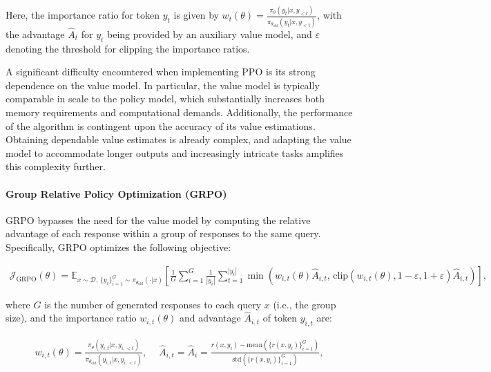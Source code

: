 Here, the importance ratio for token $y_t$ is given by $
w_{t}(\theta) = \frac{ \pi_{\theta} (y_{t} | x, y_{<t}) }{ \pi_{\theta_\text{old}} (y_{t} | x,y_{<t})} $, with the advantage $\widehat{A}_{t}$ for $y_t$ being provided by an auxiliary value model, and $\varepsilon$ denoting the threshold for clipping the importance ratios.

A significant difficulty encountered when implementing PPO is its strong dependence on the value model. In particular, the value model is typically comparable in scale to the policy model, which substantially increases both memory requirements and computational demands. Additionally, the performance of the algorithm is contingent upon the accuracy of its value estimations. Obtaining dependable value estimates is already complex, and adapting the value model to accommodate longer outputs and increasingly intricate tasks amplifies this complexity further.

\paragraph{Group Relative Policy Optimization (GRPO)} GRPO \citep{grpo} bypasses the need for the value model by computing the relative advantage of each response within a group of responses to the same query. Specifically, GRPO optimizes the following objective:

\begin{align}
\label{equ:grpo}
\mathcal{J}_\text{GRPO}(\theta) = \mathbb{E}_{ x \sim \mathcal{D},\, \{y_i\}_{i=1}^G \sim \pi_{\theta_\text{old}}( \cdot | x) }
\left[ \frac{1}{G} \sum_{i=1}^{G} \frac{1}{|y_i|} \sum_{t=1}^{|y_i|} 
\min \left( w_{i,t}(\theta) \widehat{A}_{i,t},  \, \mathrm{clip} \left( w_{i,t}(\theta), 1 - {\varepsilon}, 1 + {\varepsilon}\right) \widehat{A}_{i,t} \right)
\right],
\end{align}

where $G$ is the number of generated responses to each query $x$ (i.e., the group size), and the importance ratio $w_{i,t}(\theta)$ and advantage $\widehat{A}_{i,t}$ of token $y_{i,t}$ are:

\begin{align}
    w_{i,t}(\theta)=\frac{ \pi_{\theta} (y_{i,t} | x, y_{i,<t}) }{ \pi_{\theta_\text{old}} (y_{i,t} | x,y_{i,<t})},\quad\ 
    \widehat{A}_{i,t} = \widehat{A}_{i} = \frac{r(x, y_i) - \mathrm{mean} \left( \{ r(x, y_i) \}_{i=1}^G \right) }{ \mathrm{std} \left( \{ r(x, y_i) \}_{i=1}^G \right) },
\end{align}

